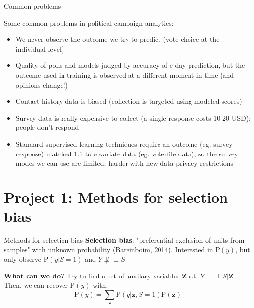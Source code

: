 \documentclass[ignorenonframetext,]{beamer}
\newcommand\ci{\perp\!\!\!\perp}
\begin{document}
\begin{frame}{Common problems}

Some common problems in political campaign analytics:
\begin{itemize}
	\item<2-> We never observe the outcome we try to predict (vote choice at the individual-level)
	\item<3-> Quality of polls and models judged by accuracy of e-day prediction, but the outcome used in training is observed at a different moment in time (and opinions change!)
	\item<4-> Contact history data is biased (collection is targeted using modeled scores)
	\item<5-> \alert<7->{Survey data is really expensive to collect (a single response costs 10-20 USD); people don't respond}
	\item<6-> \alert<7->{Standard supervised learning techniques require an outcome (eg. survey response) matched 1:1 to covariate data (eg. voterfile data), so the survey modes we can use are limited; harder with new data privacy restrictions}
\end{itemize}
\end{frame}


\section{Project 1: Methods for selection bias}

\begin{frame}{Methods for selection bias}
\textbf{Selection bias}: "preferential exclusion of units from samples" with unknown probability (Bareinboim, 2014). Interested in $\text{P}(y)$, but only observe $\text{P}(y|S = 1)$ and $Y \not \ci S$

\pause
\textbf{What can we do?}  Try to find a set of auxilary variables $\mathbf{Z}$ s.t. $Y\ci S|\mathbf{Z}$\\
\pause
Then, we can recover $\text{P}(y)$ with:
\begin{equation}\label{eq:recovery}
\text{P}(y) = \sum_\mathbf{z} \text{P}(y|\mathbf{z}, S=1)\text{P}(\mathbf{z})
\end{equation}


\end{frame}
\end{document}
